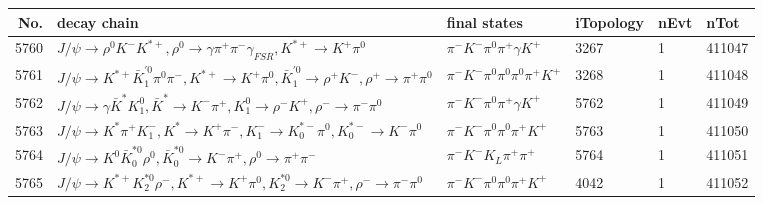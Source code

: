 \begin{table}[htbp] 
\begin{center}
\begin{small}
\begin{tabular}{rlllll}\hline\hline
 No. & decay chain & final states &  iTopology & nEvt & nTot \\\hline
5760&$J/\psi       \rightarrow \rho^{0}      K^{-}          K^{*+}         , \rho^{0}       \rightarrow \gamma       \pi^{+}        \pi^{-}        \gamma_{FSR} , K^{*+}          \rightarrow K^{+}          \pi^{0}        $&$\pi^{-}        K^{-}          \pi^{0}        \pi^{+}        \gamma       K^{+}          $& 3267&    1&411047\\
5761&$J/\psi       \rightarrow K^{*+}         \bar{K}_1^{'0}\pi^{0}        \pi^{-}        , K^{*+}          \rightarrow K^{+}          \pi^{0}        , \bar{K}_1^{'0} \rightarrow \rho^{+}      K^{-}          , \rho^{+}       \rightarrow \pi^{+}        \pi^{0}        $&$\pi^{-}        K^{-}          \pi^{0}        \pi^{0}        \pi^{0}        \pi^{+}        K^{+}          $& 3268&    1&411048\\
5762&$J/\psi       \rightarrow \gamma       \bar{K}^{*}   K_1^{0}        , \bar{K}^{*}    \rightarrow K^{-}          \pi^{+}        , K_1^{0}         \rightarrow \rho^{-}      K^{+}          , \rho^{-}       \rightarrow \pi^{-}        \pi^{0}        $&$\pi^{-}        K^{-}          \pi^{0}        \pi^{+}        \gamma       K^{+}          $& 5762&    1&411049\\
5763&$J/\psi       \rightarrow K^{*}          \pi^{+}        K_{1}^{-}      , K^{*}           \rightarrow K^{+}          \pi^{-}        , K_{1}^{-}       \rightarrow K_{0}^{*-}     \pi^{0}        , K_{0}^{*-}      \rightarrow K^{-}          \pi^{0}        $&$\pi^{-}        K^{-}          \pi^{0}        \pi^{0}        \pi^{+}        K^{+}          $& 5763&    1&411050\\
5764&$J/\psi       \rightarrow K^{0}          \bar{K}_0^{*0}\rho^{0}      , \bar{K}_0^{*0} \rightarrow K^{-}          \pi^{+}        , \rho^{0}       \rightarrow \pi^{+}        \pi^{-}        $&$\pi^{-}        K^{-}          K_{L}          \pi^{+}        \pi^{+}        $& 5764&    1&411051\\
5765&$J/\psi       \rightarrow K^{*+}         K_2^{*0}       \rho^{-}      , K^{*+}          \rightarrow K^{+}          \pi^{0}        , K_2^{*0}        \rightarrow K^{-}          \pi^{+}        , \rho^{-}       \rightarrow \pi^{-}        \pi^{0}        $&$\pi^{-}        K^{-}          \pi^{0}        \pi^{0}        \pi^{+}        K^{+}          $& 4042&    1&411052\\

\end{tabular}
\end{small}
\end{center}
\end{table}
